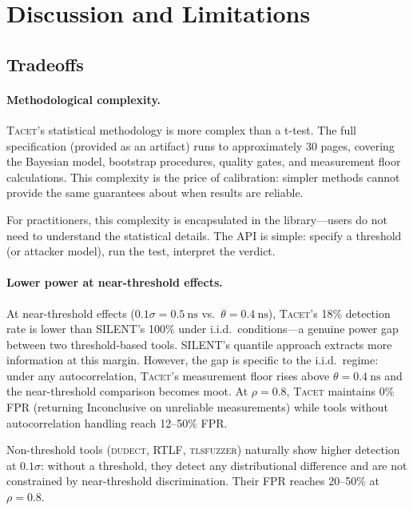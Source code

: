 \documentclass[letterpaper,twocolumn,10pt]{article}
\newcommand{\tacet}{\textsc{Tacet}\xspace}
\newcommand{\dudect}{\textsc{dudect}\xspace}
\newcommand{\tlsfuzzer}{\textsc{tlsfuzzer}\xspace}
\newcommand{\rtlf}{\textsc{RTLF}\xspace}
\newcommand{\silent}{\textsc{SILENT}\xspace}
\newcommand{\ns}[1]{\SI{#1}{\nano\second}}
\begin{document}
\section{Discussion and Limitations}
\label{sec:discussion}

\subsection{Tradeoffs}
\label{sec:discussion:tradeoffs}

\paragraph{Methodological complexity.}
\tacet's statistical methodology is more complex than a t-test. The full specification
(provided as an artifact) runs to approximately 30 pages, covering the Bayesian
model, bootstrap procedures, quality gates, and measurement floor calculations.
This complexity is the price of calibration: simpler methods cannot provide the
same guarantees about when results are reliable.

For practitioners, this complexity is encapsulated in the library—users do not
need to understand the statistical details. The API is simple: specify a threshold
(or attacker model), run the test, interpret the verdict.

\paragraph{Lower power at near-threshold effects.}
At near-threshold effects ($0.1\sigma = \ns{0.5}$ vs.\ $\theta = \ns{0.4}$),
\tacet's 18\% detection rate is lower than \silent's 100\% under i.i.d.\
conditions---a genuine power gap between two threshold-based tools.
\silent's quantile approach extracts more information at this margin.
However, the gap is specific to the i.i.d.\ regime: under any autocorrelation,
\tacet's measurement floor rises above $\theta = \ns{0.4}$ and the near-threshold
comparison becomes moot. At $\rho = 0.8$, \tacet maintains 0\% FPR (returning
Inconclusive on unreliable measurements) while tools without autocorrelation
handling reach 12--50\% FPR.

Non-threshold tools (\dudect, \rtlf, \tlsfuzzer) naturally show higher
detection at $0.1\sigma$: without a threshold, they detect any distributional
difference and are not constrained by near-threshold discrimination.
Their FPR reaches 20--50\% at $\rho = 0.8$.
\end{document}
